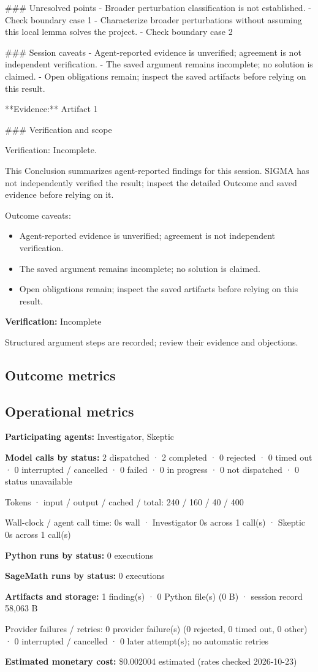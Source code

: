 \documentclass[11pt]{article}
\begin{document}
\#\#\# Unresolved points
- Broader perturbation classification is not established.
- Check boundary case 1
- Characterize broader perturbations without assuming this local lemma solves the project.
- Check boundary case 2

\#\#\# Session caveats
- Agent-reported evidence is unverified; agreement is not independent verification.
- The saved argument remains incomplete; no solution is claimed.
- Open obligations remain; inspect the saved artifacts before relying on this result.

**Evidence:** Artifact 1

\#\#\# Verification and scope

Verification: Incomplete.

This Conclusion summarizes agent-reported findings for this session. SIGMA has not independently verified the result; inspect the detailed Outcome and saved evidence before relying on it.\par
Outcome caveats:\par
\begin{itemize}
\item Agent-reported evidence is unverified; agreement is not independent verification.
\item The saved argument remains incomplete; no solution is claimed.
\item Open obligations remain; inspect the saved artifacts before relying on this result.
\end{itemize}
\textbf{Verification:} Incomplete\par
Structured argument steps are recorded; review their evidence and objections.\par
\subsection{Outcome metrics}
\subsection{Operational metrics}
\textbf{Participating agents:} Investigator, Skeptic\par
\textbf{Model calls by status:} 2 dispatched · 2 completed · 0 rejected · 0 timed out · 0 interrupted / cancelled · 0 failed · 0 in progress · 0 not dispatched · 0 status unavailable\par
Tokens · input / output / cached / total: 240 / 160 / 40 / 400\par
Wall-clock / agent call time: 0s wall · Investigator 0s across 1 call(s) · Skeptic 0s across 1 call(s)\par
\textbf{Python runs by status:} 0 executions\par
\textbf{SageMath runs by status:} 0 executions\par
\textbf{Artifacts and storage:} 1 finding(s) · 0 Python file(s) (0 B) · session record 58,063 B\par
Provider failures / retries: 0 provider failure(s) (0 rejected, 0 timed out, 0 other) · 0 interrupted / cancelled · 0 later attempt(s); no automatic retries\par
\textbf{Estimated monetary cost:} \$0.002004 estimated (rates checked 2026-10-23)\par
\end{document}
